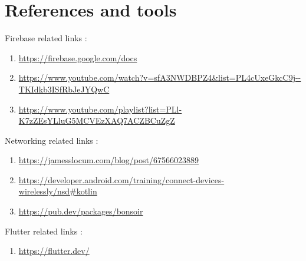 \documentclass{article}
\begin{document}
\section{References and tools}
Firebase related links :
\begin{enumerate}
    \item \url{https://firebase.google.com/docs}
    \item \url{https://www.youtube.com/watch?v=sfA3NWDBPZ4&list=PL4cUxeGkcC9j--TKIdkb3ISfRbJeJYQwC}
    \item \url{https://www.youtube.com/playlist?list=PLl-K7zZEsYLluG5MCVEzXAQ7ACZBCuZgZ}
\end{enumerate}
Networking related links :
\begin{enumerate}
    \item \url{https://jamesslocum.com/blog/post/67566023889}
    \item \url{https://developer.android.com/training/connect-devices-wirelessly/nsd#kotlin}
    \item \url{https://pub.dev/packages/bonsoir}
\end{enumerate}
Flutter related links :
\begin{enumerate}
    \item \url{https://flutter.dev/}
\end{enumerate}
\end{document}

